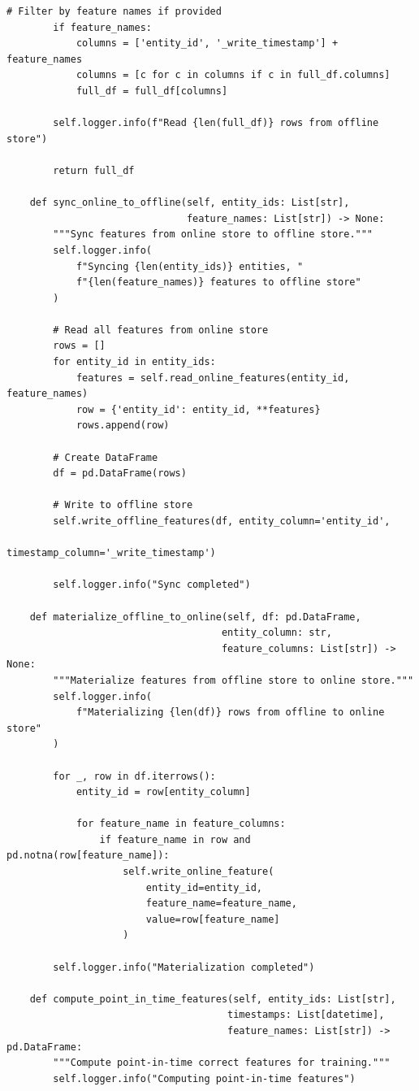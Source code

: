 \begin{lstlisting}[style=python, caption=FeatureStoreIntegrator with Dual Serving Modes]
        # Filter by feature names if provided
        if feature_names:
            columns = ['entity_id', '_write_timestamp'] + feature_names
            columns = [c for c in columns if c in full_df.columns]
            full_df = full_df[columns]

        self.logger.info(f"Read {len(full_df)} rows from offline store")

        return full_df

    def sync_online_to_offline(self, entity_ids: List[str],
                               feature_names: List[str]) -> None:
        """Sync features from online store to offline store."""
        self.logger.info(
            f"Syncing {len(entity_ids)} entities, "
            f"{len(feature_names)} features to offline store"
        )

        # Read all features from online store
        rows = []
        for entity_id in entity_ids:
            features = self.read_online_features(entity_id, feature_names)
            row = {'entity_id': entity_id, **features}
            rows.append(row)

        # Create DataFrame
        df = pd.DataFrame(rows)

        # Write to offline store
        self.write_offline_features(df, entity_column='entity_id',
                                   timestamp_column='_write_timestamp')

        self.logger.info("Sync completed")

    def materialize_offline_to_online(self, df: pd.DataFrame,
                                     entity_column: str,
                                     feature_columns: List[str]) -> None:
        """Materialize features from offline store to online store."""
        self.logger.info(
            f"Materializing {len(df)} rows from offline to online store"
        )

        for _, row in df.iterrows():
            entity_id = row[entity_column]

            for feature_name in feature_columns:
                if feature_name in row and pd.notna(row[feature_name]):
                    self.write_online_feature(
                        entity_id=entity_id,
                        feature_name=feature_name,
                        value=row[feature_name]
                    )

        self.logger.info("Materialization completed")

    def compute_point_in_time_features(self, entity_ids: List[str],
                                      timestamps: List[datetime],
                                      feature_names: List[str]) -> pd.DataFrame:
        """Compute point-in-time correct features for training."""
        self.logger.info("Computing point-in-time features")


\end{lstlisting}

